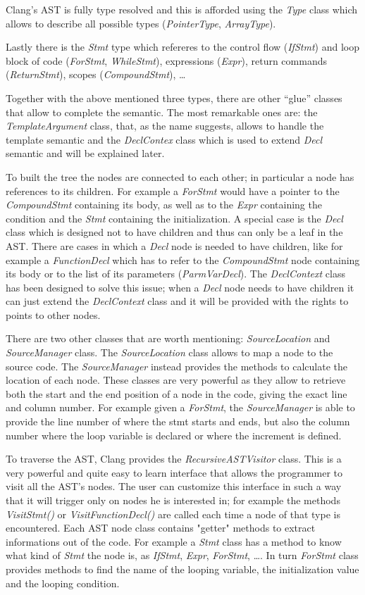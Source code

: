 \documentclass[a4paper,11pt,oneside]{book}
\begin{document}
Clang’s AST is fully type resolved and this is afforded using the \emph{Type} class which allows to describe all possible types (\emph{PointerType}, \emph{ArrayType}).

Lastly there is the \emph{Stmt} type which refereres to the control flow (\emph{IfStmt}) and loop block of code (\emph{ForStmt}, \emph{WhileStmt}), expressions (\emph{Expr}), return commands (\emph{ReturnStmt}), scopes (\emph{CompoundStmt}), \dots 

Together with the above mentioned three types, there are other “glue” classes that allow to complete the semantic. The most remarkable ones are: the \emph{TemplateArgument} class, that, as the name suggests, allows to handle the template semantic and the \emph{DeclContex} class which is used to extend \emph{Decl} semantic and will be explained later. 

To built the tree the nodes are connected to each other; in particular a node has references to its children. For example a \emph{ForStmt} would have a pointer to the \emph{CompoundStmt} containing its body, as well as to the \emph{Expr} containing the condition and the \emph{Stmt} containing the initialization. A special case is the \emph{Decl} class which is designed not to have children and thus can only be a leaf in the AST. There are cases in which a \emph{Decl} node is needed to have children, like for example a \emph{FunctionDecl} which has to refer to the \emph{CompoundStmt} node containing its body or to the list of its parameters (\emph{ParmVarDecl}). The \emph{DeclContext} class has been designed to solve this issue; when a \emph{Decl} node needs to have children it can just extend the \emph{DeclContext} class and it will be provided with the rights to points to other nodes. 

There are two other classes that are worth mentioning: \emph{SourceLocation} and \emph{SourceManager} class. The \emph{SourceLocation} class allows to map a node to the source code. The \emph{SourceManager} instead provides the methods to calculate the location of each node. These classes are very powerful as they allow to retrieve both the start and the end position of a node in the code, giving the exact line and column number. For example given a \emph{ForStmt}, the \emph{SourceManager} is able to provide the line number of where the stmt starts and ends, but also the column number where the loop variable is declared or where the increment is defined.

To traverse the AST, Clang provides the \emph{RecursiveASTVisitor} class. This is a very powerful and quite easy to learn interface that allows the programmer to visit all the AST’s nodes. The user can customize this interface in such a way that it will trigger only on nodes he is interested in; for example the methods \emph{VisitStmt()} or \emph{VisitFunctionDecl()} are called each time a node of that type is encountered. Each AST node class contains "getter" methods to extract informations out of the code. For example a \emph{Stmt} class has a method to know what kind of \emph{Stmt} the node is, as \emph{IfStmt}, \emph{Expr}, \emph{ForStmt}, \dots. In turn \emph{ForStmt} class provides methods to find the name of the looping variable, the initialization value and the looping condition.
\end{document}
